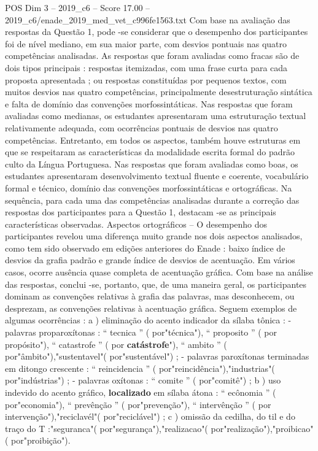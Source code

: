 \begin{textsample}{POS Dim 3 – 2019\_c6 – Score 17.00 – 2019\_c6/enade\_2019\_med\_vet\_c996fe1563.txt}
Com base na avaliação das respostas da Questão 1, pode -se considerar que o desempenho dos participantes foi de nível mediano, em sua maior parte, com desvios pontuais nas quatro competências analisadas.
As respostas que foram avaliadas como fracas são de dois tipos principais : respostas itemizadas, com uma frase curta para cada proposta apresentada ; ou respostas constituídas por pequenos textos, com muitos desvios nas quatro competências, principalmente desestruturação sintática e falta de domínio das convenções morfossintáticas.
Nas respostas que foram avaliadas como medianas, os estudantes apresentaram uma estruturação textual relativamente adequada, com ocorrências pontuais de desvios nas quatro competências.
Entretanto, em todos os aspectos, também houve estruturas em que se respeitaram as características da modalidade escrita formal do padrão culto da Língua Portuguesa.
Nas respostas que foram avaliadas como boas, os estudantes apresentaram desenvolvimento textual fluente e coerente, vocabulário formal e técnico, domínio das convenções morfossintáticas e ortográficas.
Na sequência, para cada uma das competências analisadas durante a correção das respostas dos participantes para a Questão 1, destacam -se as principais características observadas.
Aspectos ortográficos – O desempenho dos participantes revelou uma diferença muito grande nos dois aspectos analisados, como tem sido observado em edições anteriores do Enade : baixo índice de desvios da grafia padrão e grande índice de desvios de acentuação.
Em vários casos, ocorre ausência quase completa de acentuação gráfica.
Com base na análise das respostas, conclui -se, portanto, que, de uma maneira geral, os participantes dominam as convenções relativas à grafia das palavras, mas desconhecem, ou desprezam, as convenções relativas à acentuação gráfica.
Seguem exemplos de algumas ocorrências : a ) eliminação do acento indicador da sílaba tônica : - palavras proparoxítonas : “ tecnica ” ( por"técnica"), “ proposito ” ( por propósito"), “ catastrofe ” ( por \textbf{catástrofe}"), “ ambito ” ( por"âmbito"),"sustentavel"( por"sustentável") ; - palavras paroxítonas terminadas em ditongo crescente : “ reincidencia ” ( por"reincidência"),"industrias"( por"indústrias") ; - palavras oxítonas : “ comite ” ( por"comitê") ; b ) uso indevido do acento gráfico, \textbf{localizado} em sílaba átona : “ ecônomia ” ( por"economia"), “ prevênção ” ( por"prevenção"), “ intervênção ” ( por intervenção"),"reciclavél"( por"reciclável") ; c ) omissão da cedilha, do til e do traço do T :"seguranca"( por"segurança"),"realizacao"( por"realização"),"proibicao"( por"proibição").

\end{textsample}
